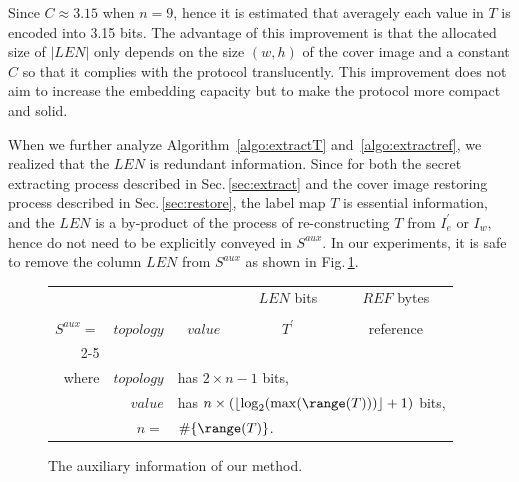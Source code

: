 Since $C \approx 3.15$ when $n = 9$, hence it is estimated that averagely each value in $T$ is encoded into 3.15 bits.
The advantage of this improvement is that the allocated size of $|LEN|$ only depends on the size $(w, h)$ of the cover image and a constant $C$ so that it complies with the protocol translucently.
This improvement does not aim to increase the embedding capacity but to make the protocol more compact and solid.

When we further analyze Algorithm~\ref{algo:extractT} and~\ref{algo:extractref}, we realized that the $LEN$ is redundant information. 
Since for both the secret extracting process described in Sec.\,\ref{sec:extract} and the cover image restoring process described in Sec.\,\ref{sec:restore}, the label map $T$ is essential information, 
and the $LEN$ is a by-product of the process of re-constructing $T$ from $I_e^\prime$ or $I_w$, 
hence do not need to be explicitly conveyed in $S^{aux}$. 
In our experiments, it is safe to remove the column $LEN$ from $S^{aux}$ as shown in Fig.\,\ref{fig:header2}.
















\begin{figure}
	\centering
	
	
	\begin{tabularx}{\linewidth}{r r@{}c cc}
		
		&&& $LEN$ bits & $REF$ bytes \\
		&&& \downbracefill& \downbracefill \\
		
		
		\hhline{*{1}{~}*{4}{-}}
		$S^{aux} =$  
		& \multicolumn{1}{|c|}{\cellcolor{black!10}$topology$}
		& \multicolumn{1}{|c|}{\cellcolor{black!10}$value$}
		& \multicolumn{1}{|c|}{\cellcolor{black!30}$T^\prime$}
		& \multicolumn{1}{|c|}{\cellcolor{black!40}reference}
		\\ \cline{2-5}
		
		&&&& \\
		
		where 
		& $ topology $ & \multicolumn{3}{l}{has $ 2 \times n - 1$  bits,} \\
		& $ value    $ & \multicolumn{3}{l}{has $ n \times (\lfloor \log_2(\max(\range(T))) \rfloor + 1)$  bits,}\\
		& $ n  =     $ & \multicolumn{3}{l}{$  \# \{ \range(T) \} $.} 
	\end{tabularx}
	
	
	\caption{The auxiliary information of our method.}
	\label{fig:header2}
\end{figure}